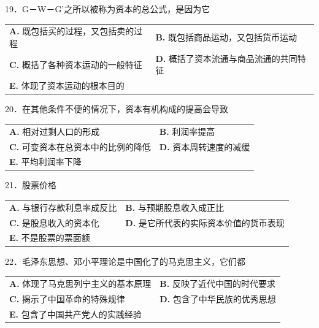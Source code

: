 \documentclass[UTF8,11pt]{ctexart}
\begin{document}
19．G－W－G’之所以被称为资本的总公式，是因为它


\begin{center}\begin{tabular}{>{\raggedright\arraybackslash}p{\dimexpr(\linewidth-4\tabcolsep)/2\relax}>{\raggedright\arraybackslash}p{\dimexpr(\linewidth-4\tabcolsep)/2\relax}}
\textbf{A.} 既包括买的过程，又包括卖的过程 & \textbf{B.} 既包括商品运动，又包括货币运动\\[.35em]
\textbf{C.} 概括了各种资本运动的一般特征 & \textbf{D.} 概括了资本流通与商品流通的共同特征\\[.35em]
\textbf{E.} 体现了资本运动的根本目的 & \\[.35em]\end{tabular}\end{center}

20．在其他条件不便的情况下，资本有机构成的提高会导致


\begin{center}\begin{tabular}{>{\raggedright\arraybackslash}p{\dimexpr(\linewidth-4\tabcolsep)/2\relax}>{\raggedright\arraybackslash}p{\dimexpr(\linewidth-4\tabcolsep)/2\relax}}
\textbf{A.} 相对过剩人口的形成 & \textbf{B.} 利润率提高\\[.35em]
\textbf{C.} 可变资本在总资本中的比例的降低 & \textbf{D.} 资本周转速度的减缓\\[.35em]
\textbf{E.} 平均利润率下降 & \\[.35em]\end{tabular}\end{center}

21．股票价格


\begin{center}\begin{tabular}{>{\raggedright\arraybackslash}p{\dimexpr(\linewidth-4\tabcolsep)/2\relax}>{\raggedright\arraybackslash}p{\dimexpr(\linewidth-4\tabcolsep)/2\relax}}
\textbf{A.} 与银行存款利息率成反比 & \textbf{B.} 与预期股息收入成正比\\[.35em]
\textbf{C.} 是股息收入的资本化 & \textbf{D.} 是它所代表的实际资本价值的货币表现\\[.35em]
\textbf{E.} 不是股票的票面额 & \\[.35em]\end{tabular}\end{center}

22．毛泽东思想、邓小平理论是中国化了的马克思主义，它们都


\begin{center}\begin{tabular}{>{\raggedright\arraybackslash}p{\dimexpr(\linewidth-4\tabcolsep)/2\relax}>{\raggedright\arraybackslash}p{\dimexpr(\linewidth-4\tabcolsep)/2\relax}}
\textbf{A.} 体现了马克思列宁主义的基本原理 & \textbf{B.} 反映了近代中国的时代要求\\[.35em]
\textbf{C.} 揭示了中国革命的特殊规律 & \textbf{D.} 包含了中华民族的优秀思想\\[.35em]
\textbf{E.} 包含了中国共产党人的实践经验 & \\[.35em]\end{tabular}\end{center}
\end{document}
